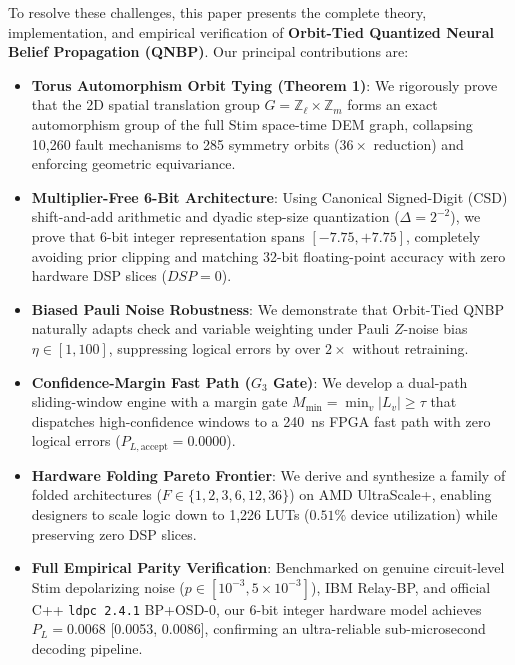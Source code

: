 \documentclass[journal]{IEEEtran}
\begin{document}
To resolve these challenges, this paper presents the complete theory, implementation, and empirical verification of \textbf{Orbit-Tied Quantized Neural Belief Propagation (QNBP)}. Our principal contributions are:
\begin{itemize}
    \item \textbf{Torus Automorphism Orbit Tying (Theorem 1)}: We rigorously prove that the 2D spatial translation group $G = \mathbb{Z}_\ell \times \mathbb{Z}_m$ forms an exact automorphism group of the full Stim space-time DEM graph, collapsing 10,260 fault mechanisms to 285 symmetry orbits ($36\times$ reduction) and enforcing geometric equivariance.
    \item \textbf{Multiplier-Free 6-Bit Architecture}: Using Canonical Signed-Digit (CSD) shift-and-add arithmetic and dyadic step-size quantization ($\Delta = 2^{-2}$), we prove that 6-bit integer representation spans $[-7.75, +7.75]$, completely avoiding prior clipping and matching 32-bit floating-point accuracy with zero hardware DSP slices ($DSP=0$).
    \item \textbf{Biased Pauli Noise Robustness}: We demonstrate that Orbit-Tied QNBP naturally adapts check and variable weighting under Pauli $Z$-noise bias $\eta \in [1, 100]$, suppressing logical errors by over $2\times$ without retraining.
    \item \textbf{Confidence-Margin Fast Path ($G_3$ Gate)}: We develop a dual-path sliding-window engine with a margin gate $M_{\min} = \min_{v} |L_v| \ge \tau$ that dispatches high-confidence windows to a 240~ns FPGA fast path with zero logical errors ($P_{L, \text{accept}} = 0.0000$).
    \item \textbf{Hardware Folding Pareto Frontier}: We derive and synthesize a family of folded architectures ($F \in \{1, 2, 3, 6, 12, 36\}$) on AMD UltraScale+, enabling designers to scale logic down to 1,226 LUTs ($0.51\%$ device utilization) while preserving zero DSP slices.
    \item \textbf{Full Empirical Parity Verification}: Benchmarked on genuine circuit-level Stim depolarizing noise ($p \in [10^{-3}, 5\times 10^{-3}]$), IBM Relay-BP, and official C++ \texttt{ldpc 2.4.1} BP+OSD-0, our 6-bit integer hardware model achieves $P_L = 0.0068$ [0.0053, 0.0086], confirming an ultra-reliable sub-microsecond decoding pipeline.
\end{itemize}
\end{document}
